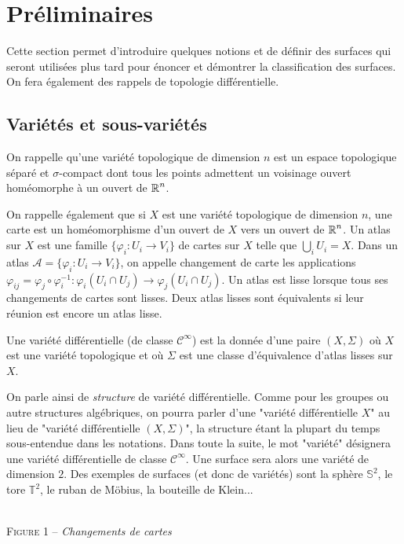 \section{Préliminaires}
Cette section permet d'introduire quelques notions et 
de définir des surfaces qui seront utilisées plus tard 
pour énoncer et démontrer la classification des surfaces.
On fera également des rappels de topologie différentielle. 

\subsection{Variétés et sous-variétés}
On rappelle qu'une variété topologique de dimension $n$ est 
un espace topologique séparé et $\sigma$-compact dont tous 
les points admettent un voisinage ouvert homéomorphe à un ouvert de $\operatorname{\mathbb R}^n$.

On rappelle également que si $X$ est une variété topologique 
de dimension $n$, une carte est un homéomorphisme d'un ouvert 
de $X$ vers un ouvert de $\operatorname{\mathbb R}^n$. Un atlas sur $X$ est une famille 
$\lbrace \varphi_i:U_i\to V_i\rbrace$ de cartes sur $X$ telle que 
$\bigcup_iU_i=X$.  Dans un atlas $\mathcal A=\lbrace \varphi_i:U_i\to V_i\rbrace$, 
on appelle changement de carte les applications 
$\varphi_{ij}=\varphi_j\circ\varphi_i^{-1}:\varphi_i(U_i\cap U_j)\to \varphi_j(U_i\cap U_j)$.
Un atlas est lisse lorsque tous ses changements de cartes sont lisses. 
Deux atlas lisses sont équivalents si leur réunion est encore un atlas lisse.

\begin{defi}
    Une variété différentielle (de classe $\mathcal C^\infty$) est la donnée 
    d'une paire $(X,\Sigma)$ où $X$ est une variété topologique et où $\Sigma$ 
    est une classe d'équivalence d'atlas lisses sur $X$.
\end{defi}

On parle ainsi de \textit{structure} de variété différentielle. 
Comme pour les groupes ou autre structures algébriques, on pourra 
parler d'une "variété différentielle $X$" au lieu de "variété différentielle $(X,\Sigma)$", 
la structure étant la plupart du temps sous-entendue dans les notations.
Dans toute la suite, le mot "variété" désignera une variété différentielle 
de classe $\mathcal C^\infty$.  Une surface sera alors une variété de 
dimension $2$. Des exemples de surfaces (et donc de variétés) sont la 
sphère $\mathbb S^2$, le tore $\mathbb T^2$, le ruban de Möbius, la bouteille de Klein... 

\begin{center}
    \\
    \vspace{1em}
    \textsc{Figure 1} – \textit{Changements de cartes}
\end{center}

